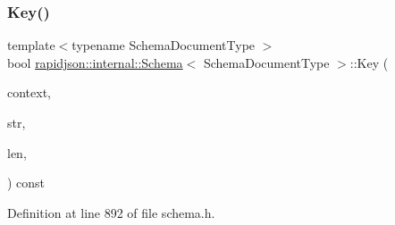 \subsubsection{\texorpdfstring{Key()}{Key()}}
{\footnotesize\ttfamily template$<$typename Schema\+Document\+Type $>$ \\
bool \mbox{\hyperlink{classrapidjson_1_1internal_1_1_schema}{rapidjson\+::internal\+::\+Schema}}$<$ Schema\+Document\+Type $>$\+::Key (\begin{DoxyParamCaption}\item[{\mbox{\hyperlink{classrapidjson_1_1internal_1_1_schema_afca06b1f51d1bc18403bdf3f4d55ffef}{Context}} \&}]{context,  }\item[{const \mbox{\hyperlink{classrapidjson_1_1internal_1_1_schema_ab9093cbc42067b8e1d3745eafe096ab3}{Ch}} $\ast$}]{str,  }\item[{\mbox{\hyperlink{namespacerapidjson_a44eb33eaa523e36d466b1ced64b85c84}{Size\+Type}}}]{len,  }\item[{bool}]{ }\end{DoxyParamCaption}) const}



Definition at line 892 of file schema.\+h.


